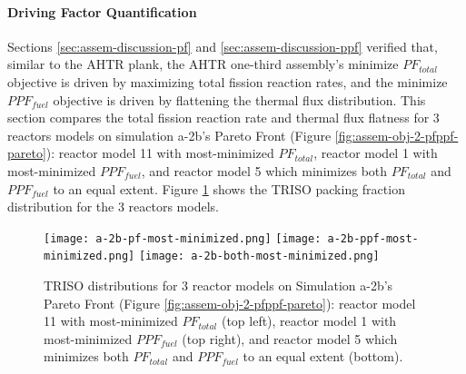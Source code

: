 \paragraph{Driving Factor Quantification}
Sections \ref{sec:assem-discussion-pf} and \ref{sec:assem-discussion-ppf} 
verified that, similar to the \gls{AHTR} plank, the \gls{AHTR} one-third assembly's 
minimize $PF_{total}$ objective is driven by maximizing total fission reaction 
rates, and the minimize $PPF_{fuel}$ objective is driven by flattening the thermal flux 
distribution. 
This section compares the total fission reaction rate and thermal flux flatness for 
3 reactors models on simulation a-2b's Pareto Front (Figure 
\ref{fig:assem-obj-2-pfppf-pareto}): reactor model 11 with most-minimized $PF_{total}$, 
reactor model 1 with most-minimized $PPF_{fuel}$, and reactor model 5 which minimizes 
both $PF_{total}$ and $PPF_{fuel}$ to an equal extent.
Figure \ref{fig:a-2b-comparison-reactors} shows the TRISO packing fraction distribution 
for the 3 reactors models.
\begin{figure}[htbp!]
    \centering
    \texttt{[image: a-2b-pf-most-minimized.png]} 
    \texttt{[image: a-2b-ppf-most-minimized.png]} 
    \texttt{[image: a-2b-both-most-minimized.png]} 
    \caption{TRISO distributions for 3 reactor models on Simulation a-2b's Pareto Front 
    (Figure \ref{fig:assem-obj-2-pfppf-pareto}): reactor model 11 with most-minimized 
    $PF_{total}$ (top left), reactor model 1 with most-minimized $PPF_{fuel}$ (top right), 
    and reactor model 5 which minimizes both $PF_{total}$ and $PPF_{fuel}$ to an equal 
    extent (bottom).}
    \label{fig:a-2b-comparison-reactors}
\end{figure}

